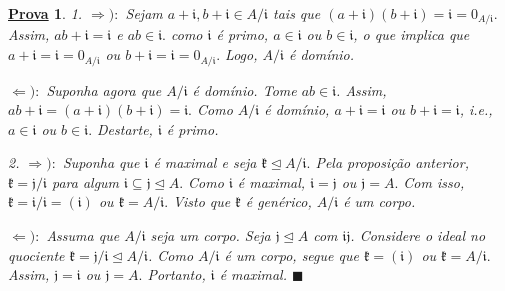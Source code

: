 \documentclass{article}
\newtheorem*{proof*}{\underline{Prova}}
\renewcommand\qedsymbol{$\blacksquare$}
\begin{document}
    \begin{proof*}
      1. \(\Rightarrow ):\) Sejam \(a+\mathfrak{i}, b+\mathfrak{i}\in A/\mathfrak{i}\) tais que \((a+\mathfrak{i})(b+\mathfrak{i})=\mathfrak{i}=0_{A/\mathfrak{i}}.\) Assim,
      \(ab+\mathfrak{i} = \mathfrak{i}\) e \(ab\in \mathfrak{i}.\) como \(\mathfrak{i}\) é primo, \(a\in \mathfrak{i}\) ou \(b\in \mathfrak{i}\), o que implica que
      \(a+\mathfrak{i} = \mathfrak{i} = 0_{A/\mathfrak{i}}\) ou \(b+\mathfrak{i} = \mathfrak{i} = 0_{A/\mathfrak{i}}.\) Logo, \(A/\mathfrak{i}\) é domínio.

      \(\Leftarrow ):\) Suponha agora que \(A/\mathfrak{i}\) é domínio. Tome \(ab\in \mathfrak{i}\). Assim, \(ab + \mathfrak{i} = (a+\mathfrak{i})(b+\mathfrak{i}) = \mathfrak{i}.\)
      Como \(A/\mathfrak{i}\) é domínio, \(a+\mathfrak{i} = \mathfrak{i}\) ou \(b+\mathfrak{i} = \mathfrak{i}\), i.e., \(a\in \mathfrak{i}\) ou \(b\in \mathfrak{i}.\) Destarte, \(\mathfrak{i}\) é primo.

      2. \(\Rightarrow ):\) Suponha que \(\mathfrak{i}\) é maximal e seja \(\mathfrak{k}\trianglelefteq{A/\mathfrak{i}}.\) Pela proposição anterior,
      \(\mathfrak{k} = \mathfrak{j}/\mathfrak{i}\) para algum \(\mathfrak{i}\subseteq \mathfrak{j}\trianglelefteq{A}.\) Como \(\mathfrak{i}\) é maximal,
      \(\mathfrak{i}=\mathfrak{j}\) ou \(\mathfrak{j} = A.\) Com isso, \(\mathfrak{k} = \mathfrak{i}/\mathfrak{i} = (\mathfrak{i})\) ou \(\mathfrak{k} = A/\mathfrak{i}.\) 
      Visto que \(\mathfrak{k}\) é genérico, \(A/\mathfrak{i}\) é um corpo.

      \(\Leftarrow ):\) Assuma que \(A/\mathfrak{i}\) seja um corpo. Seja \(\mathfrak{j}\trianglelefteq{A}\) com \(\mathfrak{i}\mathfrak{j}\).
      Considere o ideal no quociente \(\mathfrak{k} = \mathfrak{j}/\mathfrak{i}\trianglelefteq{A/\mathfrak{i}}\). Como \(A/\mathfrak{i}\) é um corpo,
      segue que \(\mathfrak{k} = (\mathfrak{i})\) ou \(\mathfrak{k} = A/\mathfrak{i}.\) Assim, \(\mathfrak{j} = \mathfrak{i}\) ou \(\mathfrak{j} = A.\)
      Portanto, \(\mathfrak{i}\) é maximal. \qedsymbol
    \end{proof*}
\end{document}
